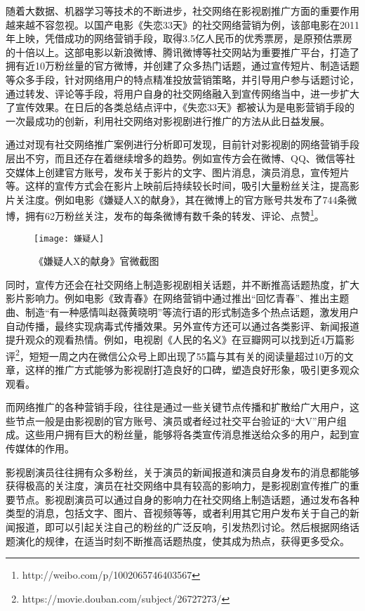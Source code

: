 随着大数据、机器学习等技术的不断进步，社交网络在影视剧推广方面的重要作用越来越不容忽视。以国产电影《失恋33天》的社交网络营销为例，该部电影在2011年上映，凭借成功的网络营销手段，取得3.5亿人民币的优秀票房，是原预估票房的十倍以上\cite{熊莉2012失恋}。这部电影以新浪微博、腾讯微博等社交网站为重要推广平台，打造了拥有近10万粉丝量的官方微博，并创建了众多热门话题，通过宣传短片、制造话题等众多手段，针对网络用户的特点精准投放营销策略，并引导用户参与话题讨论，通过转发、评论等手段，将用户自身的社交网络融入到宣传网络当中，进一步扩大了宣传效果。在日后的各类总结点评中，《失恋33天》都被认为是电影营销手段的一次最成功的创新，利用社交网络对影视剧进行推广的方法从此日益发展。

通过对现有社交网络推广案例进行分析即可发现，目前针对影视剧的网络营销手段层出不穷，而且还存在着继续增多的趋势。例如宣传方会在微博、QQ、微信等社交媒体上创建官方账号，发布关于影片的文字、图片消息，演员消息，宣传短片等。这样的宣传方式会在影片上映前后持续较长时间，吸引大量粉丝关注，提高影片关注度。例如电影《嫌疑人X的献身》，其在微博上的官方账号共发布了744条微博，拥有62万粉丝关注，发布的每条微博有数千条的转发、评论、点赞\footnote{http://weibo.com/p/1002065746403567}。

\begin{figure}[h] 
  \centering
  \texttt{[image: 嫌疑人]}
  \caption{《嫌疑人X的献身》官微截图}
\end{figure}

同时，宣传方还会在社交网络上制造影视剧相关话题，并不断推高话题热度，扩大影片影响力。例如电影《致青春》在网络营销中通过推出“回忆青春”、推出主题曲、制造“有一种感情叫赵薇黄晓明”等流行语的形式制造多个热点话题，激发用户自动传播，最终实现病毒式传播效果。另外宣传方还可以通过各类影评、新闻报道提升观众的观看热情。例如，电视剧《人民的名义》在豆瓣网可以找到近4万篇影评\footnote{https://movie.douban.com/subject/26727273/}，短短一周之内在微信公众号上即出现了55篇与其有关的阅读量超过10万的文章，这样的推广方式能够为影视剧打造良好的口碑，塑造良好形象，吸引更多观众观看。

而网络推广的各种营销手段，往往是通过一些关键节点传播和扩散给广大用户，这些节点一般是由影视剧的官方账号、演员或者经过社交平台验证的“大V”用户组成。这些用户拥有巨大的粉丝量，能够将各类宣传消息推送给众多的用户，起到宣传媒体的作用\cite{kwak2010twitter}。

影视剧演员往往拥有众多粉丝，关于演员的新闻报道和演员自身发布的消息都能够获得极高的关注度，演员在社交网络中具有较高的影响力\cite{shafiq2013identifying}，是影视剧宣传推广的重要节点。影视剧演员可以通过自身的影响力在社交网络上制造话题，通过发布各种类型的消息，包括文字、图片、音视频等等，或者利用其它用户发布关于自己的新闻报道，即可以引起关注自己的粉丝的广泛反响，引发热烈讨论。然后根据网络话题演化的规律\cite{he2009detecting}，在适当时刻不断推高话题热度，使其成为热点，获得更多受众。

